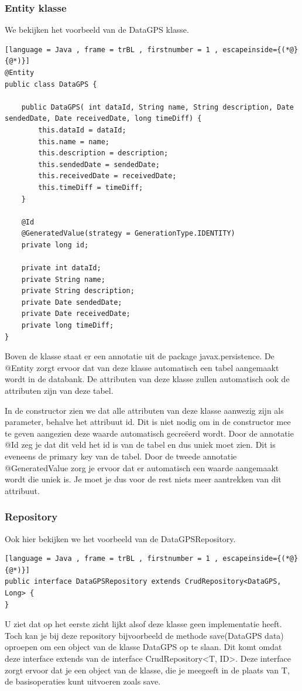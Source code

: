 \subsubsection{Entity klasse}
We bekijken het voorbeeld van de DataGPS klasse.
\begin{lstlisting}[language = Java , frame = trBL , firstnumber = 1 , escapeinside={(*@}{@*)}]
@Entity
public class DataGPS {
    
    public DataGPS( int dataId, String name, String description, Date sendedDate, Date receivedDate, long timeDiff) {
        this.dataId = dataId;
        this.name = name;
        this.description = description;
        this.sendedDate = sendedDate;
        this.receivedDate = receivedDate;
        this.timeDiff = timeDiff;
    }
    
    @Id
    @GeneratedValue(strategy = GenerationType.IDENTITY)
    private long id;
    
    private int dataId;
    private String name;
    private String description;
    private Date sendedDate;
    private Date receivedDate;
    private long timeDiff;
}
\end{lstlisting}
Boven de klasse staat er een annotatie uit de package javax.persistence. De @Entity zorgt ervoor dat van deze klasse automatisch een tabel aangemaakt wordt in de databank. De attributen van deze klasse zullen automatisch ook de attributen zijn van deze tabel.

In de constructor zien we dat alle attributen van deze klasse aanwezig zijn als parameter, behalve het attribuut id. Dit is niet nodig om in de constructor mee te geven aangezien deze waarde automatisch gecreëerd wordt. Door de annotatie @Id zeg je dat dit veld het id is van de tabel en dus uniek moet zien. Dit is eveneens de primary key van de tabel. Door de tweede annotatie @GeneratedValue zorg je ervoor dat er automatisch een waarde aangemaakt wordt die uniek is. Je moet je dus voor de rest niets meer aantrekken van dit attribuut.

\subsubsection{Repository}
Ook hier bekijken we het voorbeeld van de DataGPSRepository.
\begin{lstlisting}[language = Java , frame = trBL , firstnumber = 1 , escapeinside={(*@}{@*)}]
public interface DataGPSRepository extends CrudRepository<DataGPS, Long> {
}
\end{lstlisting}
U ziet dat op het eerste zicht lijkt alsof deze klasse geen implementatie heeft. Toch kan je bij deze repository bijvoorbeeld de methode save(DataGPS data) oproepen om een object van de klasse DataGPS op te slaan. Dit komt omdat deze interface extends van de interface CrudRepository<T, ID>. Deze interface zorgt ervoor dat je een object van de klasse, die je meegeeft in de plaats van T, de basisoperaties kunt uitvoeren zoals save.


